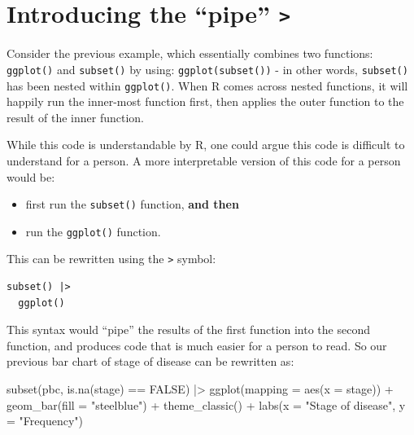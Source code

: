 \documentclass[
  a4paper,
]{memoir}
\newenvironment{Shaded}{\begin{snugshade}}{\end{snugshade}}
\newcommand{\AttributeTok}[1]{\textcolor[rgb]{0.00,0.00,0.00}{#1}}
\newcommand{\ConstantTok}[1]{\textcolor[rgb]{0.00,0.00,0.00}{#1}}
\newcommand{\FunctionTok}[1]{\textcolor[rgb]{0.00,0.00,0.00}{#1}}
\newcommand{\NormalTok}[1]{\textcolor[rgb]{0.00,0.00,0.00}{#1}}
\newcommand{\SpecialCharTok}[1]{\textcolor[rgb]{0.00,0.00,0.00}{#1}}
\newcommand{\StringTok}[1]{\textcolor[rgb]{0.00,0.00,0.00}{#1}}
\providecommand{\tightlist}{%
  \setlength{\itemsep}{0pt}\setlength{\parskip}{0pt}}
\begin{document}
\section{\texorpdfstring{Introducing the ``pipe''
\texttt{\textbar{}\textgreater{}}}{Introducing the ``pipe'' \textbar\textgreater{}}}\label{introducing-the-pipe}

Consider the previous example, which essentially combines two functions:
\texttt{ggplot()} and \texttt{subset()} by using:
\texttt{ggplot(subset())} - in other words, \texttt{subset()} has been
nested within \texttt{ggplot()}. When R comes across nested functions,
it will happily run the inner-most function first, then applies the
outer function to the result of the inner function.

While this code is understandable by R, one could argue this code is
difficult to understand for a person. A more interpretable version of
this code for a person would be:

\begin{itemize}
\tightlist
\item
  first run the \texttt{subset()} function, \textbf{and then}
\item
  run the \texttt{ggplot()} function.
\end{itemize}

This can be rewritten using the \texttt{\textbar{}\textgreater{}}
symbol:

\begin{verbatim}
subset() |> 
  ggplot()
\end{verbatim}

This syntax would ``pipe'' the results of the first function into the
second function, and produces code that is much easier for a person to
read. So our previous bar chart of stage of disease can be rewritten as:

\begin{Shaded}
\begin{Highlighting}[]
\FunctionTok{subset}\NormalTok{(pbc, }\FunctionTok{is.na}\NormalTok{(stage) }\SpecialCharTok{==} \ConstantTok{FALSE}\NormalTok{) }\SpecialCharTok{|\textgreater{}}
  \FunctionTok{ggplot}\NormalTok{(}\AttributeTok{mapping =} \FunctionTok{aes}\NormalTok{(}\AttributeTok{x =}\NormalTok{ stage)) }\SpecialCharTok{+}
  \FunctionTok{geom\_bar}\NormalTok{(}\AttributeTok{fill =} \StringTok{"steelblue"}\NormalTok{) }\SpecialCharTok{+}
  \FunctionTok{theme\_classic}\NormalTok{() }\SpecialCharTok{+}
  \FunctionTok{labs}\NormalTok{(}\AttributeTok{x =} \StringTok{"Stage of disease"}\NormalTok{, }\AttributeTok{y =} \StringTok{"Frequency"}\NormalTok{)}
\end{Highlighting}
\end{Shaded}
\end{document}
